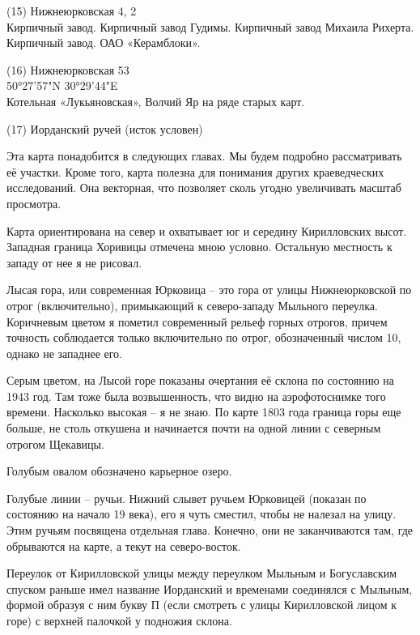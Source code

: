 \begin{flushleft}
\medskip

(15) Нижнеюрковская 4, 2\\
Кирпичный завод. Кирпичный завод Гудимы. Кирпичный завод Михаила Рихерта. Кирпичный завод. ОАО «Керамблоки».\\

\medskip

(16) Нижнеюрковская 53\\
50°27'57"N 30°29'44"E\\
Котельная «Лукьяновская», Волчий Яр на ряде старых карт.\\

\medskip

(17) Иорданский ручей (исток условен)\\

\medskip
\end{flushleft}

Эта карта понадобится в следующих главах. Мы будем подробно рассматривать её участки. Кроме того, карта полезна для понимания других краеведческих исследований. Она векторная, что позволяет сколь угодно увеличивать масштаб просмотра. 

Карта ориентирована на север и охватывает юг и середину Кирилловских высот. Западная граница Хоривицы отмечена мною условно.  Остальную местность к западу от нее я не рисовал.

Лысая гора, или современная Юрковица – это гора от улицы Нижнеюрковской по отрог (включительно), примыкающий к северо-западу Мыльного переулка. Коричневым цветом я пометил современный рельеф горных отрогов, причем точность соблюдается только включительно по отрог, обозначенный числом 10, однако не западнее его.

Серым цветом, на Лысой горе показаны очертания её склона по состоянию на 1943 год. Там тоже была возвышенность, что видно на аэрофотоснимке того времени. Насколько высокая – я не знаю. По карте 1803 года граница горы еще больше, не столь откушена и начинается почти на одной линии с северным отрогом Щекавицы.

Голубым овалом обозначено карьерное озеро.

Голубые линии – ручьи. Нижний слывет ручьем Юрковицей (показан по состоянию на начало 19 века), его я чуть сместил, чтобы не налезал на улицу. Этим ручьям посвящена отдельная глава. Конечно, они не заканчиваются там, где обрываются на карте, а текут на северо-восток.
 
Переулок от Кирилловской улицы между переулком Мыльным и Богуславским спуском раньше имел название Иорданский и временами соединялся с Мыльным, формой образуя с ним букву П (если смотреть с улицы Кирилловской лицом к горе) с верхней палочкой у подножия склона.

